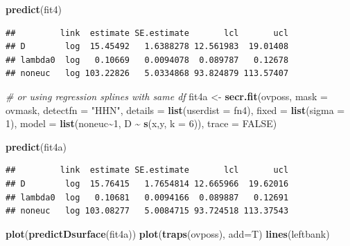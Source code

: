 \documentclass[
]{book}
\newenvironment{Shaded}{\begin{snugshade}}{\end{snugshade}}
\newcommand{\AttributeTok}[1]{\textcolor[rgb]{0.13,0.29,0.53}{#1}}
\newcommand{\CommentTok}[1]{\textcolor[rgb]{0.56,0.35,0.01}{\textit{#1}}}
\newcommand{\ConstantTok}[1]{\textcolor[rgb]{0.56,0.35,0.01}{#1}}
\newcommand{\DecValTok}[1]{\textcolor[rgb]{0.00,0.00,0.81}{#1}}
\newcommand{\FunctionTok}[1]{\textcolor[rgb]{0.13,0.29,0.53}{\textbf{#1}}}
\newcommand{\NormalTok}[1]{#1}
\newcommand{\OtherTok}[1]{\textcolor[rgb]{0.56,0.35,0.01}{#1}}
\newcommand{\SpecialCharTok}[1]{\textcolor[rgb]{0.81,0.36,0.00}{\textbf{#1}}}
\newcommand{\StringTok}[1]{\textcolor[rgb]{0.31,0.60,0.02}{#1}}
\begin{document}
\begin{Shaded}
\begin{Highlighting}[]
\FunctionTok{predict}\NormalTok{(fit4)}
\end{Highlighting}
\end{Shaded}

\begin{verbatim}
##         link  estimate SE.estimate       lcl       ucl
## D        log  15.45492   1.6388278 12.561983  19.01408
## lambda0  log   0.10669   0.0094078  0.089787   0.12678
## noneuc   log 103.22826   5.0334868 93.824879 113.57407
\end{verbatim}

\begin{Shaded}
\begin{Highlighting}[]
\CommentTok{\# or using regression splines with same df}
\NormalTok{fit4a }\OtherTok{\textless{}{-}} \FunctionTok{secr.fit}\NormalTok{(ovposs, }\AttributeTok{mask =}\NormalTok{ ovmask, }\AttributeTok{detectfn =} \StringTok{"HHN"}\NormalTok{,}
    \AttributeTok{details =} \FunctionTok{list}\NormalTok{(}\AttributeTok{userdist =}\NormalTok{ fn4), }\AttributeTok{fixed =} \FunctionTok{list}\NormalTok{(}\AttributeTok{sigma =} \DecValTok{1}\NormalTok{),}
    \AttributeTok{model =} \FunctionTok{list}\NormalTok{(noneuc}\SpecialCharTok{\textasciitilde{}}\DecValTok{1}\NormalTok{, D }\SpecialCharTok{\textasciitilde{}} \FunctionTok{s}\NormalTok{(x,y, }\AttributeTok{k =} \DecValTok{6}\NormalTok{)), }\AttributeTok{trace =} \ConstantTok{FALSE}\NormalTok{)}
\end{Highlighting}
\end{Shaded}

\begin{Shaded}
\begin{Highlighting}[]
\FunctionTok{predict}\NormalTok{(fit4a)}
\end{Highlighting}
\end{Shaded}

\begin{verbatim}
##         link  estimate SE.estimate       lcl       ucl
## D        log  15.76415   1.7654814 12.665966  19.62016
## lambda0  log   0.10681   0.0094166  0.089887   0.12691
## noneuc   log 103.08277   5.0084715 93.724518 113.37543
\end{verbatim}

\begin{Shaded}
\begin{Highlighting}[]
\FunctionTok{plot}\NormalTok{(}\FunctionTok{predictDsurface}\NormalTok{(fit4a))}
\FunctionTok{plot}\NormalTok{(}\FunctionTok{traps}\NormalTok{(ovposs), }\AttributeTok{add=}\NormalTok{T)}
\FunctionTok{lines}\NormalTok{(leftbank)}
\end{Highlighting}
\end{Shaded}
\end{document}
